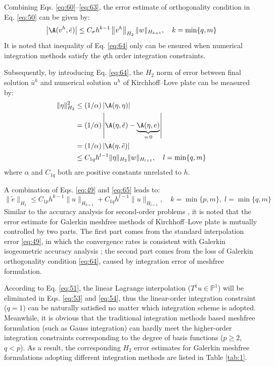 Combining Eqs. \eqref{eq:60}--\eqref{eq:63}, the error estimate of orthogonality condition in Eq. \eqref{eq:50} can be given by:
\begin{equation}\label{eq:64}
\left|\A(v^{h},\tilde{e})\right|\le C_{\sigma}h^{k-1}\left\|v^{h}\right\|_{H_2}\|w\|_{H_{k+1}},\quad k=\min\{q,m\}
\end{equation}
It is noted that inequality of Eq. \eqref{eq:64} only can be ensured when numerical integration methods satisfy the $q$th order integration constraints.

Subsequently, by introducing Eq. \eqref{eq:64}, the $H_2$ norm of error between final solution $\bar{u}^{h}$ and numerical solution $u^{h}$ of Kirchhoff--Love plate can be measured by:
\begin{equation}\label{eq:65}
\begin{aligned}
\|\eta\|^{2}_{H_2}&\le(1/\alpha)\left|\A(\eta,\eta)\right|\\
&=(1/\alpha)\left|\A(\eta,\tilde{e})-\underbrace{\A(\eta,e)}_{=\,0}\right|\\
&=(1/\alpha)\left|\A(\eta,\tilde{e})\right|\\
&\le C_{1q}h^{l-1}\|\eta\|_{H_2}\|w\|_{H_{l+1}},\quad l=\min\{q,m\}
\end{aligned}
\end{equation}
where $\alpha$ and $C_{1q}$ both are positive constants unrelated to $h$.

A combination of Eqs. \eqref{eq:49} and \eqref{eq:65} leads to:
\begin{equation}\label{eq:66}
\|\tilde{e}\|_{H_2}\le C_{1p}h^{k-1}\|u\|_{H_{k+1}}+C_{1q}h^{l-1}\|u\|_{H_{l+1}},\quad k=\min\{p,m\},\;l=\min\{q,m\}
\end{equation}
Similar to the accuracy analysis for second-order problems \cite{ref50}, it is noted that the error estimate for Galerkin meshfree methods of Kirchhoff--Love plate is mutually controlled by two parts.
The first part comes from the standard interpolation error \eqref{eq:49}, in which the convergence rates is consistent with Galerkin isogeometric accuracy analysis \cite{ref50}; the second part comes from the loss of Galerkin orthogonality condition \eqref{eq:64}, caused by integration error of meshfree formulation.

According to Eq. \eqref{eq:51}, the linear Lagrange interpolation ($T^{1}u\in\mathbb{P}^{1}$) will be eliminated in Eqs. \eqref{eq:53} and \eqref{eq:54}, thus the linear-order integration constraint ($q=1$) can be naturally satisfied no matter which integration scheme is adopted.
Meanwhile, it is obvious that the traditional integration methods based meshfree formulation (such as Gauss integration) can hardly meet the higher-order integration constraints corresponding to the degree of basis functions ($p\ge2$, $q<p$).
As a result, the corresponding $H_2$ error estimates for Galerkin meshfree formulations adopting different integration methods are listed in Table \ref{tab:1}.

